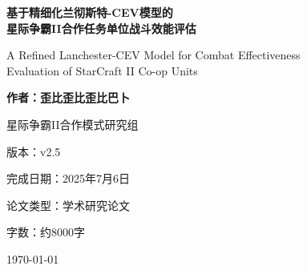 \documentclass[a4paper,12pt]{article}
\begin{document}
\begin{titlepage}
    \centering
    \vspace*{2cm}
    
    {\Huge\bfseries 基于精细化兰彻斯特-CEV模型的\\星际争霸II合作任务单位战斗效能评估\par}
    
    \vspace{1cm}
    {\Large A Refined Lanchester-CEV Model for Combat Effectiveness\\Evaluation of StarCraft II Co-op Units\par}
    
    \vspace{2cm}
    {\Large\bfseries 作者：歪比歪比歪比巴卜\par}
    
    \vspace{0.5cm}
    {\large 星际争霸II合作模式研究组\par}
    
    \vspace{2cm}
    {\large 版本：v2.5\par}
    {\large 完成日期：2025年7月6日\par}
    {\large 论文类型：学术研究论文\par}
    {\large 字数：约8000字\par}
    
    \vfill
    
    {\large \today\par}
\end{titlepage}

\begin{abstract}
本文提出了一个基于兰彻斯特方程的精细化战斗效能值（CEV）评估模型，用于客观量化《星际争霸II》合作任务模式中单位的战斗表现。该模型引入了人口税、指挥官经济模型等关键参数，并对操作难度、溅射伤害等系数进行了精细化调整。通过对六大精英单位的深入分析，验证了模型的准确性和实用性。实验结果表明，该模型能够准确反映单位间的实际强度差异，为游戏平衡性分析提供了科学可靠的量化工具。研究表明，灵魂巧匠天罚行者以146.37的CEV值位居首位，攻城坦克（对重甲）以124.28紧随其后，验证了模型的有效性。本研究为RTS游戏的量化分析提供了新的理论框架，具有重要的学术价值和实用意义。

\textbf{关键词}：星际争霸II、合作任务、战斗效能评估、兰彻斯特方程、溅射建模、游戏平衡、实时战略游戏、量化分析
\end{abstract}

\newpage
\tableofcontents
\newpage
\end{document}
